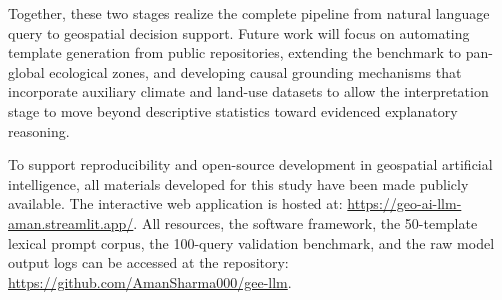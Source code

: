 \documentclass[pdflatex,sn-mathphys-ay]{sn-jnl}
\begin{document}
Together, these two stages realize the complete pipeline from natural language query to geospatial decision support. Future work will focus on automating template generation from public repositories, extending the benchmark to pan-global ecological zones, and developing causal grounding mechanisms that incorporate auxiliary climate and land-use datasets to allow the interpretation stage to move beyond descriptive statistics toward evidenced explanatory reasoning.

To support reproducibility and open-source development in geospatial artificial intelligence, all materials developed for this study have been made publicly available. The interactive web application is hosted at: \url{https://geo-ai-llm-aman.streamlit.app/}. All resources, the software framework, the 50-template lexical prompt corpus, the 100-query validation benchmark, and the raw model output logs can be accessed at the repository: \url{https://github.com/AmanSharma000/gee-llm}.


\end{document}
